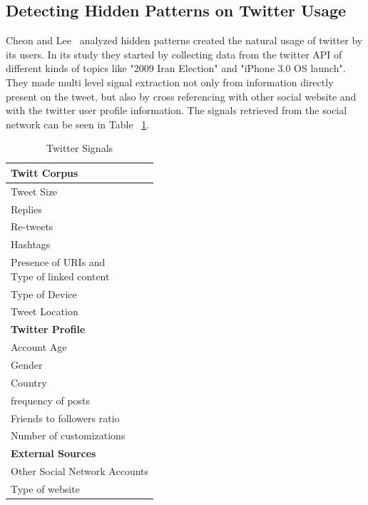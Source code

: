 \subsection{Detecting Hidden Patterns on Twitter Usage} 
\label{sub:detecting_hidden_patterns_on_twitter_usage}
Cheon and Lee~\citep{Cheong2010} analyzed hidden patterns created the natural usage of twitter by its users. In its study they started by collecting data from the twitter API of different kinds of topics like "2009 Iran Election" and "iPhone 3.0 OS launch". They made multi level signal extraction not only from information directly present on the tweet, but also by cross referencing with other social website and with the twitter user profile information. The signals retrieved from the social network can be seen in Table ~\ref{tab:twitter_signals}.

\begin{table}[H]
  \caption{Twitter Signals}
  \label{tab:twitter_signals}
  \begin{center}
    \begin{tabular}{|l|}
      \hline
      \textbf{Twitt Corpus}  \\
      \hline
      Tweet Size \\
      \hline
      Replies \\
      \hline
      Re-tweets \\
      \hline
      Hashtags  \\
      \hline
      \specialcell{Presence of URIs and \\ Type of linked content} \\
      \hline
      Type of Device   \\
      \hline
      Tweet Location  \\
      \hline                 
      \hline                 
      \textbf{Twitter Profile} \\ 
      \hline
      Account Age   \\
      \hline
      Gender     \\
      \hline
      Country \\    
      \hline
      frequency of posts \\
      \hline
      Friends to followers ratio \\ 
      \hline
      Number of  customizations \\   
      \hline
      \hline
      \textbf{External Sources} \\
      \hline
      Other Social Network Accounts   \\
      \hline
      Type of website\\ 
      \hline
    \end{tabular}
  \end{center}
\end{table}

